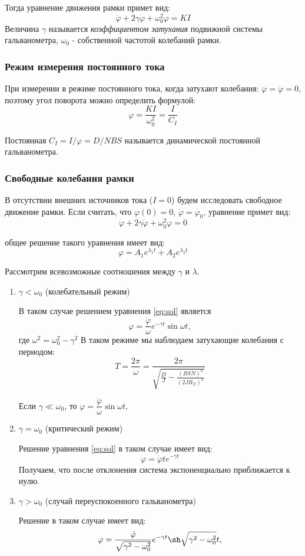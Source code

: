 \documentclass[a4paper, 12pt]{article}
\begin{document}
Тогда уравнение движения рамки примет вид:
\begin{equation}
\label{eq:diff}
\ddot{\varphi} +2\gamma\dot{\varphi} + \omega_0^2 \varphi = KI
\end{equation}
Величина $\gamma$ называется \textit{коэффициентом затухания} подвижной системы гальванометра,  $\omega_0$ - собственной частотой колебаний рамки.

\subsubsection*{Режим измерения постоянного тока}
При измерении в режиме постоянного тока, когда затухают колебания: $\ddot{\varphi} = \dot{\varphi} = 0$, поэтому угол поворота можно определить формулой:
$$\varphi = \dfrac{KI}{\omega_0^2} = \dfrac{I}{C_I}$$

Постоянная $C_I =I/\varphi= D/NBS$ называется динамической постоянной гальванометра.

\subsubsection*{Свободные колебания рамки}

В отсутствии внешних источников тока ($I = 0$) будем исследовать свободное движение рамки.
Если считать, что $\varphi(0) = 0$, $\dot{\varphi} = \dot{\varphi_0}$, уравнение примет вид:
$$\ddot{\varphi} +2 \gamma \dot{\varphi} + \omega^2_0 \varphi = 0$$

общее решение такого уравнения имеет вид:
\begin{equation}
\varphi = A_1 e^{\lambda_1t} + A_2e^{\lambda_2t}
\label{eq:sol}
\end{equation}


Рассмотрим всевозможные соотношения между $\gamma$ и $\lambda$.

\begin{enumerate}

\item $\gamma < \omega_0$ (колебательный режим)

В таком случае решением уравнения \ref{eq:sol} является 
$$ \varphi = \dfrac{\dot{\varphi}}{\omega}e^{-\gamma t} \sin \omega t,$$
где $\omega^2 = \omega^2_0 - \gamma^2$
В таком режиме мы наблюдаем затухающие колебания с периодом:
$$T = \dfrac{2\pi}{\omega} = \dfrac{2 \pi}{\sqrt{\frac{D}{J} - \frac{(BSN)^4}{(2JR_\Sigma)^2}}}$$

Если $\gamma \ll \omega_0$, то $ \varphi = \dfrac{\dot{\varphi}}{\omega} \sin \omega t,$

\item $\gamma = \omega_0$ (критический режим)

Решение уравнения \ref{eq:sol} в таком случае имеет вид:
$$\varphi = \dot{\varphi	}te^{-\gamma   t}$$
Получаем, что после отклонения система экспоненциально приближается к нулю.

\item $\gamma > \omega_0$ (случай переуспокоенного гальванометра)

Решение в таком случае имеет вид:
$$ \varphi = \dfrac{\dot{\varphi}}{\sqrt{\gamma^2 - \omega_0^2}}e^{-\gamma t} \sh\sqrt{\gamma^2 - \omega_0^2}  t,$$
\end{enumerate}
\end{document}
